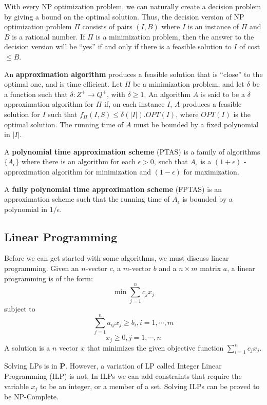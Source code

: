 \documentclass[12pt,letterpaper]{article}
\theoremstyle{definition}
\begin{document}
With every NP optimization problem, we can naturally create a decision problem by giving a bound on the optimal solution. Thus, the decision version of NP optimization problem $\Pi$ consists of pairs $(I,B)$ where $I$ is an instance of $\Pi$ and $B$ is a rational number. If $\Pi$ is a minimization problem, then the answer to the decision version will be ``yes'' if and only if there is a feasible solution to $I$ of cost $\leq B$.

An \textbf{approximation algorithm}  produces a feasible solution that is ``close'' to the optimal one, and is time efficient. Let $\Pi$ be a minimization problem, and let $\delta$ be a function such that $\delta:Z^+ \rightarrow Q^+$, with $\delta \geq 1$. An algorithm $A$ is said to be a $\delta$ approximation algorithm for $\Pi$ if, on each instance $I$, $A$ produces a feasible solution for $I$ such that $f_\Pi(I,S) \leq \delta(|I|). OPT(I)$, where $OPT(I)$ is the optimal solution. The running time of $A$ must be bounded by a fixed polynomial in $|I|$.

A \textbf{polynomial time approximation scheme} (PTAS) is a family of algorithms $\{A_\epsilon\}$ where there is an algorithm for each $\epsilon > 0$, such that $A_\epsilon$ is a $(1+\epsilon)$ - approximation algorithm for minimization and $(1-\epsilon)$ for maximization.

A \textbf{fully polynomial time approximation scheme}  (FPTAS) is an approximation scheme such that the running time of $A_{\epsilon}$ is bounded by a polynomial in $1/\epsilon$.

\subsection{Linear Programming}

Before we can get started with some algorithms, we must discuss linear programming. Given an $n$-vector $c$, a $m$-vector $b$ and a $n \times m$ matrix $a$, a linear programming is of the form:
\[\min \sum_{j=1}^n c_j x_j\]
subject to
\[\sum_{j=1}^n a_{ij}x_j \geq b_i, i = 1, \cdots, m\]
\[x_j \geq 0, j = 1, \cdots, n\]
A solution is a $n$ vector $x$ that minimizes the given objective function $\sum_{i=1}^n c_jx_j$.

Solving LPs is in $\mathbf{P}$. However, a variation of LP called Integer Linear Programming (ILP) is not. In ILPs we can add constraints that require the variable $x_j$ to be an integer, or a member of a set. Solving ILPs can be proved to be NP-Complete.
\end{document}
